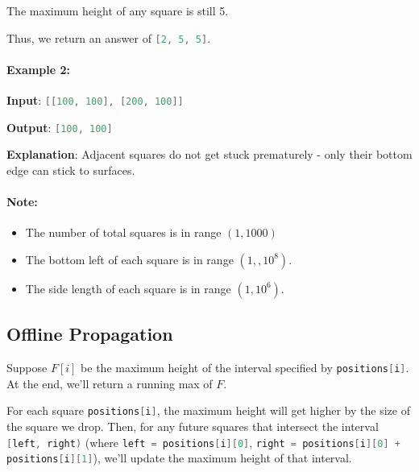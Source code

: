 \begin{flushleft}
The maximum height of any square is still 5.

Thus, we return an answer of \lstinline[language=C++, basicstyle=\small\ttfamily, keywordstyle=\bfseries\color{green!40!black}]|[2, 5, 5]|.
\end{flushleft}

\paragraph{Example 2:}
\begin{flushleft}
\textbf{Input}: \lstinline[language=C++, basicstyle=\small\ttfamily, keywordstyle=\bfseries\color{green!40!black}]|[[100, 100], [200, 100]]|

\textbf{Output}: \lstinline[language=C++, basicstyle=\small\ttfamily, keywordstyle=\bfseries\color{green!40!black}]|[100, 100]|

\textbf{Explanation}: Adjacent squares do not get stuck prematurely - only their bottom edge can stick to surfaces.
\end{flushleft}

\paragraph{Note:}
\begin{itemize}
\item The number of total squares is in range $(1, 1000)$

\item The bottom left of each square is in range $(1,,10^8)$.

\item The side length of each square is  in range $(1,10^6)$.
\end{itemize}

\subsection{Offline Propagation}
Suppose $F[i]$ be the maximum height of the interval specified by \lstinline[language=C++, basicstyle=\small\ttfamily, keywordstyle=\bfseries\color{green!40!black}]|positions[i]|. At the end, we'll return a running max of $F$.

For each square \lstinline[language=C++, basicstyle=\small\ttfamily, keywordstyle=\bfseries\color{green!40!black}]|positions[i]|, the maximum height will get higher by the size of the square we drop. Then, for any future squares that intersect the interval \lstinline[language=C++, basicstyle=\small\ttfamily, keywordstyle=\bfseries\color{green!40!black}]|[left, right)| (where \lstinline[language=C++, basicstyle=\small\ttfamily, keywordstyle=\bfseries\color{green!40!black}]|left = positions[i][0]|, \lstinline[language=C++, basicstyle=\small\ttfamily, keywordstyle=\bfseries\color{green!40!black}]|right = positions[i][0] + positions[i][1]|), we'll update the maximum height of that interval.

